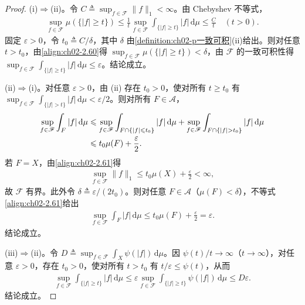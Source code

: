 \documentclass[../../main.tex]{subfiles}%
\begin{document}
\begin{proof}
(i)$\Rightarrow$(ii)。令 $C\triangleq \sup_{f\in\mathscr F}\|f\|_1<\infty$。由 Chebyshev 不等式，
\begin{align}
\sup_{f\in\mathscr F}\mu(\{|f|\geqslant t\})\leqslant\frac1t\sup_{f\in\mathscr F}\int_{\{|f|\geqslant t\}}|f|\,\mathrm{d}\mu\leqslant\frac Ct\quad(t>0). \label{align:ch02-2.60}
\end{align}
固定 $\varepsilon>0$，令 $t_0\triangleq C/\delta$，其中 $\delta$ 由\cref{definition:ch02-p一致可积}(ii)给出。则对任意 $t>t_0$，由\eqref{align:ch02-2.60}得 $\sup_{f\in\mathscr F}\mu(\{|f|\geqslant t\})<\delta$，由 $\mathscr F$ 的一致可积性得 $\sup_{f\in\mathscr F}\int_{\{|f|\geqslant t\}}|f|\,\mathrm{d}\mu\leqslant\varepsilon$。结论成立。

(ii)$\Rightarrow$(i)。对任意 $\varepsilon>0$，由 (ii) 存在 $t_0>0$，使对所有 $t\geqslant t_0$ 有 $\sup_{f\in\mathscr F}\int_{\{|f|>t\}}|f|\,\mathrm{d}\mu<\varepsilon/2$。则对所有 $F\in\mathscr A$，
\begin{align}
\sup_{f\in\mathscr F}\int_F|f|\,\mathrm{d}\mu
&\leqslant\sup_{f\in\mathscr F}\int_{F\cap\{|f|\leqslant t_0\}}|f|\,\mathrm{d}\mu
+\sup_{f\in\mathscr F}\int_{F\cap\{|f|>t_0\}}|f|\,\mathrm{d}\mu \notag\\
&\leqslant t_0\mu(F)+\frac\varepsilon2. \label{align:ch02-2.61}
\end{align}
若 $F=X$，由\eqref{align:ch02-2.61}得
\begin{align*}
\sup_{f\in\mathscr F}\|f\|_1\leqslant t_0\mu(X)+\frac\varepsilon2<\infty,
\end{align*}
故 $\mathscr F$ 有界。此外令 $\delta\triangleq \varepsilon/(2t_0)$。则对任意 $F\in\mathscr A$（$\mu(F)<\delta$），不等式\eqref{align:ch02-2.61}给出
\begin{align*}
\sup_{f\in\mathscr F}\int_F|f|\,\mathrm{d}\mu\leqslant t_0\mu(F)+\frac\varepsilon2=\varepsilon.
\end{align*}
结论成立。

(iii)$\Rightarrow$(ii)。令 $D\triangleq \sup_{f\in\mathscr F}\int_X\psi(|f|)\,\mathrm{d}\mu$。因 $\psi(t)/t\to\infty$（$t\to\infty$），对任意 $\varepsilon>0$，存在 $t_0>0$，使对所有 $t>t_0$ 有 $t/\varepsilon\leqslant\psi(t)$，从而
\begin{align*}
\sup_{f\in\mathscr F}\int_{\{|f|\geqslant t\}}|f|\,\mathrm{d}\mu
\leqslant\varepsilon\sup_{f\in\mathscr F}\int_{\{|f|\geqslant t\}}\psi(|f|)\,\mathrm{d}\mu\leqslant D\varepsilon.
\end{align*}
结论成立。


\end{proof}
\end{document}
